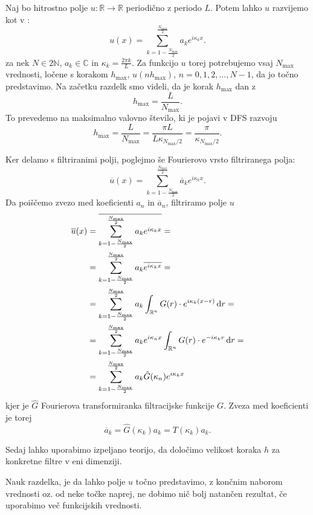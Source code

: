 \documentclass[mat2, tisk]{fmfdelo}
\newcommand{\R}{\mathbb R}
\newcommand{\N}{\mathbb N}
\newcommand{\C}{\mathbb C}
\begin{document}
\noindent
Naj bo hitrostno polje $u: \R \rightarrow \R$ periodično z periodo $L$.
Potem lahko $u$ razvijemo kot v :
$$
u(x) = \sum_{k=1-\frac{N_{\text{max}}}{2}}^{\frac{N_\text{max}}{2}} a_k e^{i\kappa_k x}.
$$
za nek $N \in 2\N$, $a_k \in \C$ in $\kappa_k = \frac{2\pi k}{L}$. 
Za funkcijo $u$ torej potrebujemo vsaj $N_{\text{max}}$ vrednosti, ločene s korakom $h_{\text{max}}$,
$u(n h_{\text{max}})$, $n = 0, 1, 2, \dots, N - 1$, da jo točno predstavimo.
Na začetku razdelk smo videli, da je korak $h_\text{max}$ dan z 
$$
h_\text{max} = \frac{L}{N_\text{max}}.
$$
To prevedemo na maksimalno valovno število, ki je pojavi v DFS razvoju 
$$
h_\text{max} = \frac{L}{N_\text{max}} = \frac{\pi L}{L \kappa_{{N_\text{max}/2}}} = \frac{\pi}{\kappa_{N_\text{max}/2}}.
$$

Ker delamo s filtriranimi polji, poglejmo še Fourierovo vrsto filtriranega polja:
\begin{equation}
\label{eq:filterDFT}
\overline{u}(x) = \sum_{k=1-\frac{N_{\text{max}}}{2}}^{\frac{N_\text{max}}{2}} \overline{a}_k e^{i\kappa_k x}.
\end{equation}
Da poiščemo zvezo med koeficienti $a_n$ in $\overline{a}_n$, filtriramo polje $u$
\begin{align*}
\overline{u}(x) &= \overline{\sum_{k=1-\frac{N_{\text{max}}}{2}}^{\frac{N_\text{max}}{2}} a_k e^{i\kappa_k x}} = \\
&= \sum_{k=1-\frac{N_{\text{max}}}{2}}^{\frac{N_\text{max}}{2}} a_k \overline{e^{i\kappa_k x}} = \\ 
&= \sum_{k=1-\frac{N_{\text{max}}}{2}}^{\frac{N_\text{max}}{2}} a_k \int_{\R^n} G(r)\cdot e^{i\kappa_k(x - r)} \dif r = \\
&= \sum_{k=1-\frac{N_{\text{max}}}{2}}^{\frac{N_\text{max}}{2}} a_k e^{i\kappa_n x }\int_{\R^n} G(r)\cdot e^{-i\kappa_k r} \dif r =\\
&= \sum_{k=1-\frac{N_{\text{max}}}{2}}^{\frac{N_\text{max}}{2}} a_k \hat{G}(\kappa_n) e^{i\kappa_k x}
\end{align*}
kjer je $\hat{G}$ Fourierova transformiranka filtracijske funkcije $G$. Zveza med koeficienti je torej 
\begin{equation}
  \label{koef_filter}
\overline{a}_k = \hat{G}(\kappa_k) a_k = T(\kappa_k) a_k.
\end{equation}

Sedaj lahko uporabimo izpeljano teorijo, da določimo velikost koraka $h$ 
za konkretne filtre v eni dimenziji. 

\begin{opomba}
Nauk razdelka, je da lahko polje $u$ točno predstavimo, z končnim naborom 
vrednosti oz. od neke točke naprej, ne dobimo nič bolj natančen rezultat, če 
uporabimo več funkcijskih vrednosti.
\end{opomba}
\end{document}
